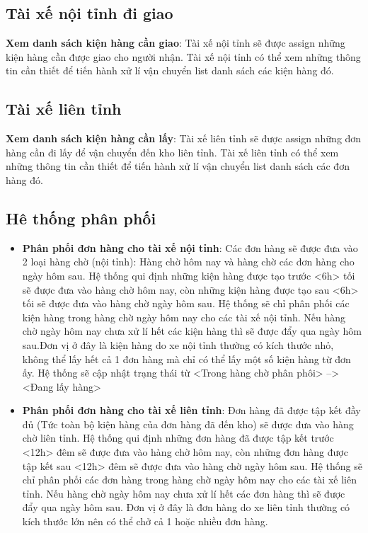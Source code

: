 \begin{itemize}
	\subsection{Tài xế nội tỉnh đi giao}
	\textbf{Xem danh sách kiện hàng cần giao}:  Tài xế nội tỉnh sẽ được assign những kiện hàng cần được giao cho người nhận. Tài xế nội tỉnh có thể xem những thông tin cần thiết để tiến hành xử lí vận chuyển list danh sách các kiện hàng đó.
	
	\subsection{Tài xế liên tỉnh} 
	\textbf{Xem danh sách kiện hàng cần lấy}: Tài xế liên tỉnh sẽ được assign những đơn hàng cần đi lấy để vận chuyển đến kho liên tỉnh. Tài xế liên tỉnh có thể xem những thông tin cần thiết để tiến hành xử lí vận chuyển list danh sách các đơn hàng đó.
	\subsection{Hê thống phân phối}
	\begin{itemize}
		\item \textbf{Phân phối đơn hàng cho tài xế nội tỉnh}: Các đơn hàng sẽ được đưa vào 2 loại hàng chờ (nội tỉnh): Hàng chờ hôm nay và hàng chờ các đơn hàng cho ngày hôm sau. Hệ thống qui định những kiện hàng được tạo trước <6h> tối sẽ được đưa vào hàng chờ hôm nay, còn những kiện hàng được tạo sau <6h> tối sẽ được đưa vào hàng chờ ngày hôm sau. Hệ thống sẽ chỉ phân phối các kiện hàng trong hàng chờ ngày hôm nay cho các tài xế nội tỉnh. Nếu hàng chờ ngày hôm nay chưa xử lí hết các kiện hàng thì sẽ được đẩy qua ngày hôm sau.Đơn vị ở đây là kiện hàng do xe nội tỉnh thường có kích thước nhỏ, không thể lấy hết cả 1 đơn hàng mà chỉ có thể lấy một số kiện hàng từ đơn ấy. Hệ thống sẽ cập nhật trạng thái từ <Trong hàng chờ phân phôi>  -->  <Đang lấy hàng>
		\item \textbf{Phân phối đơn hàng cho tài xế liên tỉnh}: Đơn hàng đã được tập kết đầy đủ (Tức toàn bộ kiện hàng của đơn hàng đã đến kho) sẽ được đưa vào hàng chờ liên tỉnh. Hệ thống qui định những đơn hàng đã được tập kết trước <12h> đêm sẽ được đưa vào hàng chờ hôm nay, còn những đơn hàng được tập kết sau <12h> đêm sẽ được đưa vào hàng chờ ngày hôm sau. Hệ thống sẽ chỉ phân phối các đơn hàng trong hàng chờ ngày hôm nay cho các tài xế liên tỉnh. Nếu hàng chờ ngày hôm nay chưa xử lí hết các đơn hàng thì sẽ được đẩy qua ngày hôm sau. Đơn vị ở đây là đơn hàng do xe liên tỉnh thường có kích thước lớn nên có thể chở cả 1 hoặc nhiều đơn hàng.
	\end{itemize}
	

\end{itemize}
